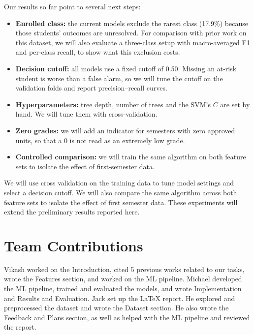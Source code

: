 \documentclass[11pt]{article}
\begin{document}
Our results so far point to several next steps:
\begin{itemize}
  \item \textbf{Enrolled class:} the current models exclude the rarest class (17.9\%) because those students' outcomes are unresolved.
    For comparison with prior work on this dataset, we will also evaluate a three-class setup with macro-averaged F1 and per-class recall, to show what this exclusion costs.
  \item \textbf{Decision cutoff:} all models use a fixed cutoff of 0.50.
    Missing an at-risk student is worse than a false alarm, so we will tune the cutoff on the validation folds and report precision--recall curves.
  \item \textbf{Hyperparameters:} tree depth, number of trees and the SVM's $C$ are set by hand.
    We will tune them with cross-validation.
  \item \textbf{Zero grades:} we will add an indicator for semesters with zero approved units, so that a 0 is not read as an extremely low grade.
  \item \textbf{Controlled comparison:} we will train the same algorithm on both feature sets to isolate the effect of first-semester data.
\end{itemize}

We will use cross validation on the training data to tune model settings and select a decision cutoff. We will also compare the same algorithm across both feature sets to isolate the effect of first semester data. These experiments will extend the preliminary results reported here.


\section*{Team Contributions}

Vikash worked on the Introduction, cited 5 previous works related to our tasks, wrote the Features section, and worked on the ML pipeline.
Michael developed the ML pipeline, trained and evaluated the models, and wrote Implementation and Results and Evaluation.
Jack set up the LaTeX report. He explored and preprocessed the dataset and wrote the Dataset section. He also wrote the Feedback and Plans section, as well as helped with the ML pipeline and reviewed the report.


%





\end{document}
